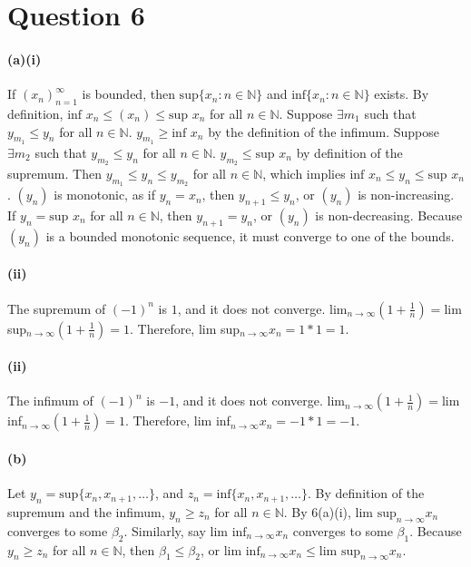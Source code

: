 \documentclass[10pt,letter]{article}
\begin{document}
\section*{Question 6}

\paragraph{(a)(i)} If $(x_n)_{n=1}^\infty$ is bounded, then $\text{sup}\{x_n:n\in\mathbb{N}\}$ and $\text{inf}\{x_n:n\in\mathbb{N}\}$ exists. By definition, $\text{inf }x_n\leq(x_n)\leq \text{sup }x_n$ for all $n\in\mathbb{N}$. Suppose $\exists m_1$ such that $y_{m_1}\leq y_n$ for all $n\in\mathbb{N}$. $y_{m_1}\geq\text{inf }x_n$ by the definition of the infimum. Suppose $\exists m_2$ such that $y_{m_2}\leq y_n$ for all $n\in\mathbb{N}$. $y_{m_2}\leq\text{sup }x_n$ by definition of the supremum. Then $y_{m_1}\leq y_n\leq y_{m_2}$ for all $n\in\mathbb{N}$, which implies $\text{inf }x_n\leq y_n\leq \text{sup }x_n$. $(y_n)$ is monotonic, as if $y_n = x_n$, then $y_{n+1} \leq y_n$, or $(y_n)$ is non-increasing. If $y_n=\text{sup }x_n$ for all $n\in\mathbb{N}$, then $y_{n+1}=y_n$, or $(y_n)$ is non-decreasing. Because $(y_n)$ is a bounded monotonic sequence, it must converge to one of the bounds. 

\paragraph{(ii)} The supremum of $(-1)^n$ is $1$, and it does not converge. lim$_{n\rightarrow\infty}(1+\frac{1}{n})=$lim sup$_{n\rightarrow\infty}(1+\frac{1}{n})=1$. Therefore, lim sup$_{n\rightarrow\infty}x_n= 1* 1 = 1$.

\paragraph{(ii)} The infimum of $(-1)^n$ is $-1$, and it does not converge. lim$_{n\rightarrow\infty}(1+\frac{1}{n})=$lim inf$_{n\rightarrow\infty}(1+\frac{1}{n})=1$. Therefore, lim inf$_{n\rightarrow\infty}x_n= -1* 1 = -1$.

\paragraph{(b)} Let $y_n=\text{sup}\{x_n,x_{n+1},\ldots\}$, and $z_n=\text{inf}\{x_n,x_{n+1},\ldots\}$. By definition of the supremum and the infimum, $y_n\geq z_n$ for all $n\in\mathbb{N}$. By 6(a)(i), $\text{lim sup}_{n\rightarrow\infty} x_n$ converges to some $\beta_2$. Similarly, say $\text{lim inf}_{n\rightarrow\infty} x_n$ converges to some $\beta_1$. Because $y_n\geq z_n$ for all $n\in\mathbb{N}$, then $\beta_1\leq\beta_2$, or $\text{lim inf}_{n\rightarrow\infty} x_n\leq\text{lim sup}_{n\rightarrow\infty} x_n$. 
\end{document}
